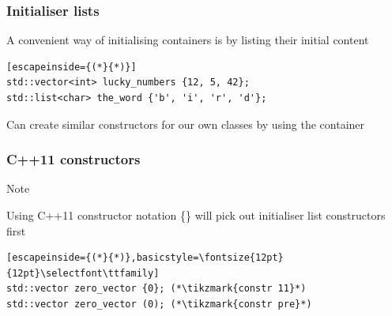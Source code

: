 \documentclass[14pt,a4paper,dvipsnames,usenames]{beamer}
\begin{document}
\begin{frame}[fragile]
  \frametitle{Initialiser lists}

  A convenient way of initialising containers is by listing their initial content

  \vspace{.5cm}
  \begin{lstlisting}[escapeinside={(*}{*)}]
std::vector<int> lucky_numbers {12, 5, 42};
std::list<char> the_word {'b', 'i', 'r', 'd'};
  \end{lstlisting}

  \vspace{.5cm}
  Can create similar constructors for our own classes by using the  container

  \CPPEleven

  
\end{frame}

\begin{frame}[fragile]
  \frametitle{C++11 constructors}

  {\Large\color{Marty}Note}

  \vspace{.2cm}
  Using C++11 constructor notation {\large\color{Tropiteal}\{\}} will pick out initialiser list constructors first

  \vspace{.5cm}
  \begin{lstlisting}[escapeinside={(*}{*)},basicstyle=\fontsize{12pt}{12pt}\selectfont\ttfamily]
std::vector zero_vector {0}; (*\tikzmark{constr 11}*)
std::vector zero_vector (0); (*\tikzmark{constr pre}*)
  \end{lstlisting}

  \nointerlineskip
  
  \CPPEleven
  
\end{frame}
\end{document}
